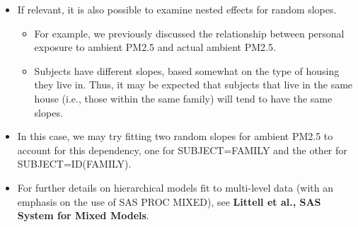 \documentclass[
  9pt,
  ignorenonframetext,
]{beamer}
\begin{document}
\begin{frame}{}
\protect\hypertarget{section-7}{}
\begin{itemize}
\item
  If relevant, it is also possible to examine nested effects for random
  slopes.

  \begin{itemize}
  \item
    For example, we previously discussed the relationship between
    personal exposure to ambient PM2.5 and actual ambient PM2.5.
  \item
    Subjects have different slopes, based somewhat on the type of
    housing they live in. Thus, it may be expected that subjects that
    live in the same house (i.e., those within the same family) will
    tend to have the same slopes.
  \end{itemize}
\item
  In this case, we may try fitting two random slopes for ambient PM2.5
  to account for this dependency, one for SUBJECT=FAMILY and the other
  for SUBJECT=ID(FAMILY).
\item
  For further details on hierarchical models fit to multi-level data
  (with an emphasis on the use of SAS PROC MIXED), see \textbf{Littell
  et al., SAS System for Mixed Models}.
\end{itemize}
\end{frame}
\end{document}
